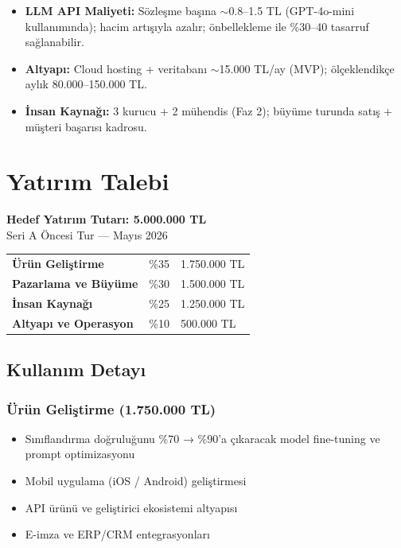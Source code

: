 \documentclass[12pt,a4paper]{article}
\begin{document}
\begin{itemize}[itemsep=3pt]
  \item \textbf{LLM API Maliyeti:} Sözleşme başına $\sim$0.8–1.5 TL (GPT-4o-mini kullanımında);
  hacim artışıyla azalır; önbellekleme ile \%30–40 tasarruf sağlanabilir.
  \item \textbf{Altyapı:} Cloud hosting + veritabanı $\sim$15.000 TL/ay (MVP); ölçeklendikçe
  aylık 80.000–150.000 TL.
  \item \textbf{İnsan Kaynağı:} 3 kurucu + 2 mühendis (Faz 2); büyüme turunda satış + müşteri
  başarısı kadrosu.
\end{itemize}

\section{Yatırım Talebi}

\begin{statbox}
\begin{center}
{\color{primary}\Large\textbf{Hedef Yatırım Tutarı: 5.000.000 TL}}\\[0.5em]
{\color{muted}Seri A Öncesi Tur — Mayıs 2026}\\[1em]
\begin{tabular}{lrl}
\textbf{Ürün Geliştirme} & \%35 & 1.750.000 TL \\
\textbf{Pazarlama ve Büyüme} & \%30 & 1.500.000 TL \\
\textbf{İnsan Kaynağı} & \%25 & 1.250.000 TL \\
\textbf{Altyapı ve Operasyon} & \%10 & 500.000 TL \\
\end{tabular}
\end{center}
\end{statbox}

\subsection{Kullanım Detayı}

\subsubsection{Ürün Geliştirme (1.750.000 TL)}
\begin{itemize}[itemsep=3pt]
  \item Sınıflandırma doğruluğunu \%70 → \%90'a çıkaracak model fine-tuning ve prompt
  optimizasyonu
  \item Mobil uygulama (iOS / Android) geliştirmesi
  \item API ürünü ve geliştirici ekosistemi altyapısı
  \item E-imza ve ERP/CRM entegrasyonları
\end{itemize}
\end{document}
